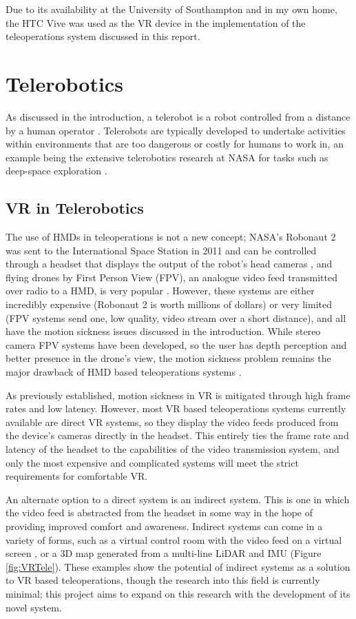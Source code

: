 Due to its availability at the University of Southampton and in my own home, the HTC Vive was used as the VR device in the implementation of the teleoperations system discussed in this report. 

\section{Telerobotics}

As discussed in the introduction, a telerobot is a robot controlled from a distance by a human operator \cite{NAP4761}. Telerobots are typically developed to undertake activities within environments that are too dangerous or costly for humans to work in, an example being the extensive telerobotics research at NASA for tasks such as deep-space exploration \cite{fong2017interactive}.

\subsection{VR in Telerobotics}
\label{subsection:VRTele}

The use of HMDs in teleoperations is not a new concept; NASA's Robonaut 2 was sent to the International Space Station in 2011 and can be controlled through a headset that displays the output of the robot's head cameras \cite{Robonaut}, and flying drones by First Person View (FPV), an analogue video feed transmitted over radio to a HMD, is very popular \cite{FPV}. However, these systems are either incredibly expensive (Robonaut 2 is worth millions of dollars) or very limited (FPV systems send one, low quality, video stream over a short distance), and all have the motion sickness issues discussed in the introduction. While stereo camera FPV systems have been developed, so the user has depth perception and better presence in the drone's view, the motion sickness problem remains the major drawback of HMD based teleoperations systems \cite{2FPV}.

As previously established, motion sickness in VR is mitigated through high frame rates and low latency. However, most VR based teleoperations systems currently available are direct VR systems, so they display the video feeds produced from the device's cameras directly in the headset. This entirely ties the frame rate and latency of the headset to the capabilities of the video transmission system, and only the most expensive and complicated systems will meet the strict requirements for comfortable VR.

An alternate option to a direct system is an indirect system. This is one in which the video feed is abstracted from the headset in some way in the hope of providing improved comfort and awareness. Indirect systems can come in a variety of forms, such as a virtual control room with the video feed on a virtual screen \cite{lipton2018baxter}, or a 3D map generated from a multi-line LiDAR and IMU \cite{wang2017novel} (Figure \ref{fig:VRTele}). These examples show the potential of indirect systems as a solution to VR based teleoperations, though the research into this field is currently minimal; this project aims to expand on this research with the development of its novel system.

